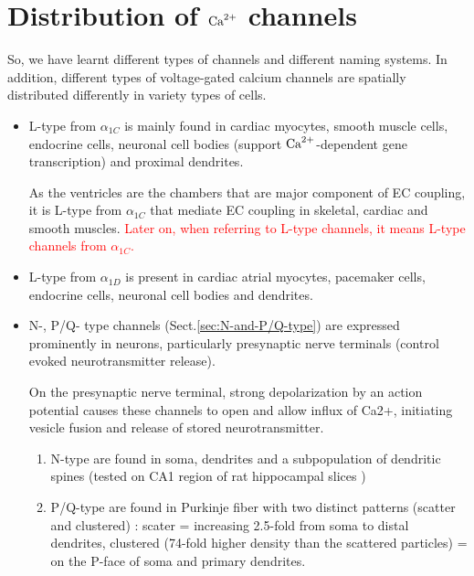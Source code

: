 \section{Distribution of ${\text{Ca}^{2+}}$ channels}
\label{sec:calcium-channels-distribution}

So, we have learnt different types of  channels and
different naming systems. In addition, different types of
voltage-gated calcium channels are spatially distributed differently
in variety types of cells.  
\begin{itemize}
\item L-type  from $\alpha_{1C}$ is mainly found in cardiac
  myocytes, smooth muscle cells, endocrine cells, neuronal cell bodies
  (support ${\text{Ca}^{2+}}$-dependent gene transcription) and proximal dendrites.  
  
  As the ventricles are the chambers that are major component of EC coupling, it
  is L-type  from $\alpha_{1C}$ that mediate EC coupling in skeletal,
  cardiac and smooth muscles.
  \textcolor{red}{Later on, when referring to L-type channels, it
    means L-type  channels from $\alpha_{1C}$.}
  

\item L-type  from $\alpha_{1D}$ is
  present in cardiac atrial myocytes, pacemaker cells, endocrine cells, neuronal
  cell bodies and dendrites.
  

\item N-, P/Q- type  channels (Sect.\ref{sec:N-and-P/Q-type}) are
expressed prominently in neurons, particularly presynaptic nerve terminals
(control evoked neurotransmitter release).

On the presynaptic nerve terminal, strong depolarization by an action potential
causes these channels to open and allow influx of Ca2+, initiating vesicle
fusion and release of stored neurotransmitter.

\begin{enumerate}
    \item N-type are found in soma, dendrites and a subpopulation of dendritic
  spines (tested on CA1 region of rat hippocampal slices \citep{mills1994})
  
  \item P/Q-type are found in Purkinje fiber with two distinct patterns
  (scatter and clustered) \citep{indriati2013}:
  scater = increasing 2.5-fold from soma to distal dendrites, clustered (74-fold
  higher density than the scattered particles) = on the P-face of soma and
  primary dendrites.
  

\end{enumerate}
\end{itemize}
